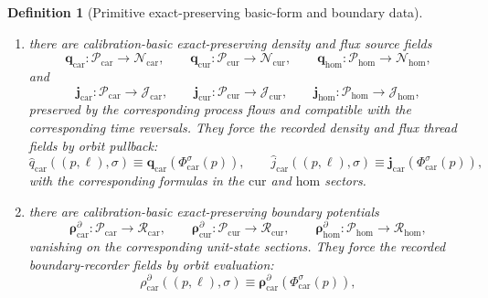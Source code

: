\documentclass[11pt]{article}
\newcommand{\TensorDensityClass}{\mathscr N_{\mathrm{car}}}
\newcommand{\CurDensityClass}{\mathscr N_{\mathrm{cur}}}
\newcommand{\HomDensityClass}{\mathscr N_{\mathrm{hom}}}
\newcommand{\TensorFluxClass}{\mathscr J_{\mathrm{car}}}
\newcommand{\CurFluxClass}{\mathscr J_{\mathrm{cur}}}
\newcommand{\HomFluxClass}{\mathscr J_{\mathrm{hom}}}
\newcommand{\TensorPhaseReadClass}{\mathscr R_{\mathrm{car}}}
\newcommand{\CurPhaseReadClass}{\mathscr R_{\mathrm{cur}}}
\newcommand{\HomPhaseReadClass}{\mathscr R_{\mathrm{hom}}}
\newcommand{\CurRateDensity}{\lambda_{\mathrm{cur}}}
\newcommand{\HomRateDensity}{\lambda_{\mathrm{hom}}}
\newcommand{\TensorDensityField}{\widehat q_{\mathrm{car}}}
\newcommand{\TensorFluxField}{\widehat j_{\mathrm{car}}}
\newcommand{\TensorBoundaryRecorder}{\rho_{\mathrm{car}}^{\partial}}
\newcommand{\TensorProcSpace}{\mathcal P_{\mathrm{car}}}
\newcommand{\CurProcSpace}{\mathcal P_{\mathrm{cur}}}
\newcommand{\HomProcSpace}{\mathcal P_{\mathrm{hom}}}
\newcommand{\CurFlowField}{X_{\mathrm{cur}}}
\newcommand{\HomFlowField}{X_{\mathrm{hom}}}
\newcommand{\TensorOrbitFlow}{\Phi_{\mathrm{car}}}
\newcommand{\CurOrbitFlow}{\Phi_{\mathrm{cur}}}
\newcommand{\HomOrbitFlow}{\Phi_{\mathrm{hom}}}
\newcommand{\CurRateForm}{\boldsymbol{\lambda}_{\mathrm{cur}}}
\newcommand{\HomRateForm}{\boldsymbol{\lambda}_{\mathrm{hom}}}
\newcommand{\TensorDensitySource}{\boldsymbol{q}_{\mathrm{car}}}
\newcommand{\CurDensitySource}{\boldsymbol{q}_{\mathrm{cur}}}
\newcommand{\HomDensitySource}{\boldsymbol{q}_{\mathrm{hom}}}
\newcommand{\TensorFluxSource}{\boldsymbol{j}_{\mathrm{car}}}
\newcommand{\CurFluxSource}{\boldsymbol{j}_{\mathrm{cur}}}
\newcommand{\HomFluxSource}{\boldsymbol{j}_{\mathrm{hom}}}
\newcommand{\TensorBoundarySource}{\boldsymbol{\rho}_{\mathrm{car}}^{\partial}}
\newcommand{\CurBoundarySource}{\boldsymbol{\rho}_{\mathrm{cur}}^{\partial}}
\newcommand{\HomBoundarySource}{\boldsymbol{\rho}_{\mathrm{hom}}^{\partial}}
\newtheorem{definition}{Definition}
\begin{document}
\begin{definition}[Primitive exact-preserving basic-form and boundary data]
\begin{enumerate}
\begin{equation}
    \label{eq:rate_density_from_form_car}
    \end{equation}
    \begin{equation}
    \CurRateDensity((q,\ell),\sigma)
    \equiv
    \left(\CurRateForm(\CurFlowField)\right)(\CurOrbitFlow^\sigma(q)),
    \label{eq:rate_density_from_form_cur}
    \end{equation}
    \begin{equation}
    \HomRateDensity((r,\ell),\sigma)
    \equiv
    \left(\HomRateForm(\HomFlowField)\right)(\HomOrbitFlow^\sigma(r)).
    \label{eq:rate_density_from_form_hom}
    \end{equation}
    \item there are calibration-basic exact-preserving density and flux source fields
    \[
    \TensorDensitySource:\TensorProcSpace\to\TensorDensityClass,\qquad
    \CurDensitySource:\CurProcSpace\to\CurDensityClass,\qquad
    \HomDensitySource:\HomProcSpace\to\HomDensityClass,
    \]
    and
    \[
    \TensorFluxSource:\TensorProcSpace\to\TensorFluxClass,\qquad
    \CurFluxSource:\CurProcSpace\to\CurFluxClass,\qquad
    \HomFluxSource:\HomProcSpace\to\HomFluxClass,
    \]
    preserved by the corresponding process flows and compatible with the corresponding time reversals. They force the recorded density and flux thread fields by orbit pullback:
    \begin{equation}
    \TensorDensityField((p,\ell),\sigma)\equiv\TensorDensitySource(\TensorOrbitFlow^\sigma(p)),\qquad
    \TensorFluxField((p,\ell),\sigma)\equiv\TensorFluxSource(\TensorOrbitFlow^\sigma(p)),
    \label{eq:density_flux_from_source_car}
    \end{equation}
    with the corresponding formulas in the \(\mathrm{cur}\) and \(\mathrm{hom}\) sectors.
    \item there are calibration-basic exact-preserving boundary potentials
    \[
    \TensorBoundarySource:\TensorProcSpace\to\TensorPhaseReadClass,\qquad
    \CurBoundarySource:\CurProcSpace\to\CurPhaseReadClass,\qquad
    \HomBoundarySource:\HomProcSpace\to\HomPhaseReadClass,
    \]
    vanishing on the corresponding unit-state sections. They force the recorded boundary-recorder fields by orbit evaluation:
    \begin{equation}
    \TensorBoundaryRecorder((p,\ell),\sigma)
    \equiv
    \TensorBoundarySource(\TensorOrbitFlow^\sigma(p)),
    \label{eq:boundary_recorder_from_source_car}
    \end{equation}
    \begin{equation}

\end{equation}
\end{enumerate}
\end{definition}
\end{document}
